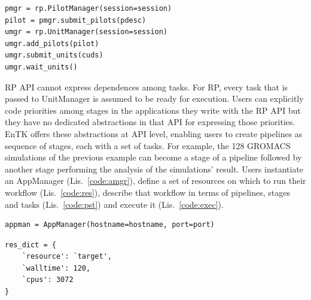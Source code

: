 \documentclass[preprint,12pt, a4paper]{elsarticle}
\begin{document}
\begin{lstlisting}
pmgr = rp.PilotManager(session=session)
pilot = pmgr.submit_pilots(pdesc)
umgr = rp.UnitManager(session=session)
umgr.add_pilots(pilot)
umgr.submit_units(cuds)
umgr.wait_units()
\end{lstlisting}

RP API cannot express dependences among tasks. For RP, every task that is
passed to UnitManager is assumed to be ready for execution. Users can
explicitly code priorities among stages in the applications they write with
the RP API but they have no dedicated abstractions in that API for expressing
those priorities. EnTK offers these abstractions at API level, enabling users
to create pipelines as sequence of stages, each with a set of tasks. For
example, the 128 GROMACS simulations of the previous example can become a
stage of a pipeline followed by another stage performing the analysis of the
simulations' result. Users instantiate an AppManager (Lis.~\ref{code:amgr}),
define a set of resources on which to run their workflow
(Lis.~\ref{code:res}), describe that workflow in terms of pipelines, stages
and tasks (Lis.~\ref{code:pst}) and execute it (Lis.~\ref{code:exec}).

\begin{lstlisting}
appman = AppManager(hostname=hostname, port=port)
\end{lstlisting}

\begin{lstlisting}
res_dict = {
    `resource': `target',
    `walltime': 120,
    `cpus': 3072
}
\end{lstlisting}
\end{document}
